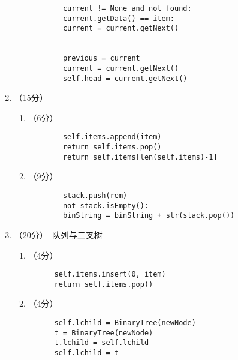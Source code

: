 \documentclass[8pt]{article}
\newlength{\lc}
\newlength{\ld}
\begin{document}
\begin{CJK}{UTF8}{gkai}
\begin{enumerate}
\begin{enumerate}
\begin{lstlisting}
        current != None and not found:
        current.getData() == item:
        current = current.getNext()
       

        previous = current
        current = current.getNext()
        self.head = current.getNext()
      \end{lstlisting}
  \end{enumerate}
\item （15分）
  \begin{enumerate}
    \item （6分）
      \begin{lstlisting}
        self.items.append(item)
        return self.items.pop()
        return self.items[len(self.items)-1]
      \end{lstlisting}
    \item （9分）
      \begin{lstlisting}
        stack.push(rem)
        not stack.isEmpty():
        binString = binString + str(stack.pop())
      \end{lstlisting}
  \end{enumerate}
\item （20分）~队列与二叉树
  \begin{enumerate}
  \item （4分）~
    \begin{lstlisting}
      self.items.insert(0, item)
      return self.items.pop()
    \end{lstlisting}
  \item （4分）~
    \begin{lstlisting}
      self.lchild = BinaryTree(newNode)
      t = BinaryTree(newNode)
      t.lchild = self.lchild
      self.lchild = t
      \end{lstlisting}
      

\end{enumerate}
\end{enumerate}
\end{CJK}
\end{document}
